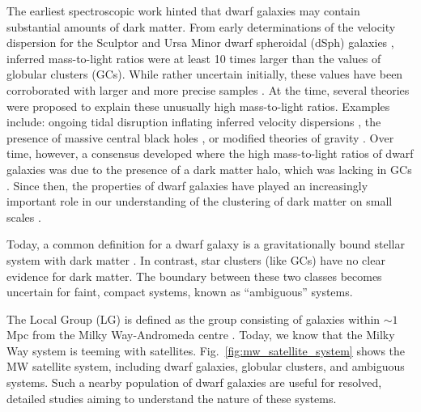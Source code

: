 The earliest spectroscopic work hinted that dwarf galaxies may contain
substantial amounts of dark matter. From early determinations of the
velocity dispersion for the Sculptor and Ursa Minor dwarf spheroidal
(dSph) galaxies \citep[e.g.,][]{aaronson1983, aaronson+olszewski1987},
inferred mass-to-light ratios were at least 10 times larger than the
values of globular clusters (GCs). While rather uncertain initially,
these values have been corroborated with larger and more precise samples
\citep[e.g.,][]{hargreaves+1994}. At the time, several theories were
proposed to explain these unusually high mass-to-light ratios. Examples
include: ongoing tidal disruption inflating inferred velocity
dispersions \citep[e.g.,][]{kuhn+miller1989}, the presence of massive
central black holes \citep[e.g.,][]{strobel+lake1994}, or modified
theories of gravity \citep{milgrom1995}. Over time, however, a consensus
developed where the high mass-to-light ratios of dwarf galaxies was due
to the presence of a dark matter halo, which was lacking in GCs
\citep[e.g.,][]{dekel+silk1986, wechsler+tinker2018}. Since then, the
properties of dwarf galaxies have played an increasingly important role
in our understanding of the clustering of dark matter on small scales
\citep[e.g.,][]{sales+2022, bullock+boylan-kolchin2017}.

Today, a common definition for a dwarf galaxy is a gravitationally bound
stellar system with dark matter \citep[or, more specifically, not
consistent with newtonian dynamics of visible matter
alone,][]{willman+strader2012}. In contrast, star clusters (like GCs)
have no clear evidence for dark matter. The boundary between these two
classes becomes uncertain for faint, compact systems, known as
``ambiguous'' systems.

The Local Group (LG) is defined as the group consisting of galaxies
within \(\sim 1\) Mpc from the Milky Way-Andromeda centre \citep[e.g.,][
and references therein]{mcconnachie2012}. Today, we know that the Milky
Way system is teeming with satellites.
Fig.~\ref{fig:mw_satellite_system} shows the MW satellite system,
including dwarf galaxies, globular clusters, and ambiguous systems. Such
a nearby population of dwarf galaxies are useful for resolved, detailed
studies aiming to understand the nature of these systems.

